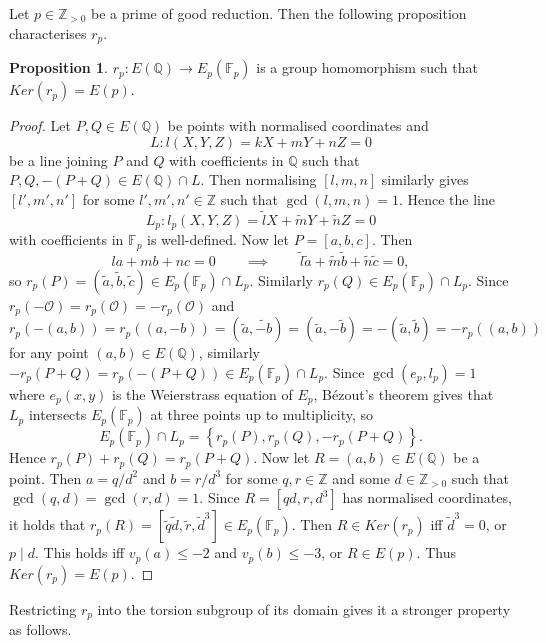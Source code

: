\documentclass{article}
\newcommand{\F}{\mathbb{F}}
\newcommand{\Z}{\mathbb{Z}}
\newcommand{\Q}{\mathbb{Q}}
\newcommand{\rb}[1]{\left( #1 \right)}
\renewcommand{\sb}[1]{\left[ #1 \right]}
\newcommand{\cb}[1]{\left\{ #1 \right\}}
\theoremstyle{definition}\newtheorem*{definition}{Definition}
\theoremstyle{definition}\newtheorem*{example}{Example}
\theoremstyle{definition}\newtheorem*{remark}{Remark}
\newtheorem{proposition}{Proposition}[subsection]
\begin{document}
\pagebreak

Let $ p \in \Z_{> 0} $ be a prime of good reduction. Then the following proposition characterises $ r_p $.

\begin{proposition}
$ r_p : E\rb{\Q} \to E_p\rb{\F_p} $ is a group homomorphism such that $ Ker\rb{r_p} = E\rb{p} $.
\end{proposition}

\begin{proof}
Let $ P, Q \in E\rb{\Q} $ be points with normalised coordinates and
$$ L : l\rb{X, Y, Z} = kX + mY + nZ = 0 $$
be a line joining $ P $ and $ Q $ with coefficients in $ \Q $ such that $ P, Q, -\rb{P + Q} \in E\rb{\Q} \cap L $. Then normalising $ \sb{l, m, n} $ similarly gives $ \sb{l', m', n'} $ for some $ l', m', n '\in \Z $ such that $ \gcd\rb{l, m, n} = 1 $. Hence the line
$$ L_p : l_p\rb{X, Y, Z} = \tilde{l}X + \tilde{m}Y + \tilde{n}Z = 0 $$
with coefficients in $ \F_p $ is well-defined. Now let $ P = \sb{a, b, c} $. Then
$$ la + mb + nc = 0 \qquad \implies \qquad \tilde{l}\tilde{a} + \tilde{m}\tilde{b} + \tilde{n}\tilde{c} = 0, $$
so $ r_p\rb{P} = \rb{\tilde{a}, \tilde{b}, \tilde{c}} \in E_p\rb{\F_p} \cap L_p $. Similarly $ r_p\rb{Q} \in E_p\rb{\F_p} \cap L_p $. Since $ r_p\rb{-\mathcal{O}} = r_p\rb{\mathcal{O}} = -r_p\rb{\mathcal{O}} $ and
$$ r_p\rb{-\rb{a, b}} = r_p\rb{\rb{a, -b}} = \rb{\tilde{a}, \tilde{-b}} = \rb{\tilde{a}, -\tilde{b}} = -\rb{\tilde{a}, \tilde{b}} = -r_p\rb{\rb{a, b}} $$
for any point $ \rb{a, b} \in E\rb{\Q} $, similarly $ -r_p\rb{P + Q} = r_p\rb{-\rb{P + Q}} \in E_p\rb{\F_p} \cap L_p $. Since $ \gcd\rb{e_p, l_p} = 1 $ where $ e_p\rb{x, y} $ is the Weierstrass equation of $ E_p $, Bézout's theorem gives that $ L_p $ intersects $ E_p\rb{\F_p} $ at three points up to multiplicity, so
$$ E_p\rb{\F_p} \cap L_p = \cb{r_p\rb{P}, r_p\rb{Q}, -r_p\rb{P + Q}}. $$
Hence $ r_p\rb{P} + r_p\rb{Q} = r_p\rb{P + Q} $. Now let $ R = \rb{a, b} \in E\rb{\Q} $ be a point. Then $ a = q / d^2 $ and $ b = r / d^3 $ for some $ q, r \in \Z $ and some $ d \in \Z_{> 0} $ such that $ \gcd\rb{q, d} = \gcd\rb{r, d} = 1 $. Since $ R = \sb{qd, r, d^3} $ has normalised coordinates, it holds that $ r_p\rb{R} = \sb{\tilde{q}\tilde{d}, \tilde{r}, \tilde{d}^3} \in E_p\rb{\F_p} $. Then $ R \in Ker\rb{r_p} $ iff $ \tilde{d}^3 = 0 $, or $ p \mid d $. This holds iff $ v_p\rb{a} \le -2 $ and $ v_p\rb{b} \le -3 $, or $ R \in E\rb{p} $. Thus $ Ker\rb{r_p} = E\rb{p} $.
\end{proof}

Restricting $ r_p $ into the torsion subgroup of its domain gives it a stronger property as follows.
\end{document}
